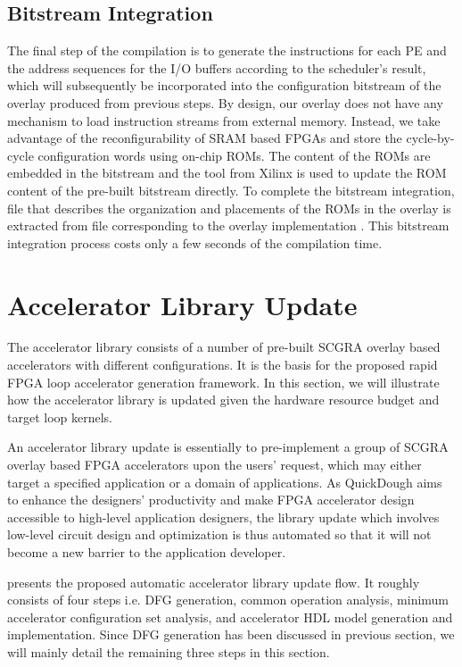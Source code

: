 \subsection{Bitstream Integration}
The final step of the compilation is to generate the instructions for each PE and the address sequences for the I/O buffers according to the scheduler's result, which will subsequently be incorporated into the configuration bitstream of the overlay produced from previous steps.
By design, our overlay does not have any mechanism to load instruction streams from external memory.
Instead, we take advantage of the reconfigurability of SRAM based FPGAs and store the cycle-by-cycle configuration words using on-chip ROMs. The content of the ROMs are embedded in the bitstream and the  tool from Xilinx \cite{data2mem} is used to update the ROM content of the pre-built bitstream directly. To complete the bitstream integration,  file that describes the organization and placements of the ROMs in the overlay is extracted from  file corresponding to the overlay implementation \cite{beckhoff2011xilinx}.
This bitstream integration process costs only a few seconds of the compilation time.

\section{Accelerator Library Update} \label{sec:library-update}
The accelerator library consists of a number of pre-built SCGRA overlay based accelerators with different configurations. It is the basis for the proposed rapid FPGA loop accelerator generation framework. In this section, we will illustrate how the accelerator library is updated given the hardware resource budget and target loop kernels.

An accelerator library update is essentially to pre-implement a group of SCGRA overlay based FPGA accelerators upon the users' request, which may either target a specified application or a domain of applications. As QuickDough aims to enhance the designers' productivity and make FPGA accelerator design accessible to high-level application designers, the library update which involves low-level circuit design and optimization is thus automated so that it will not become a new barrier to the application developer.

 presents the proposed automatic accelerator library update flow. It roughly consists of four steps i.e. DFG generation, common operation analysis, minimum accelerator configuration set analysis, and accelerator HDL model generation and implementation. Since DFG generation has been discussed in previous section, we will mainly detail the remaining three steps in this section.

